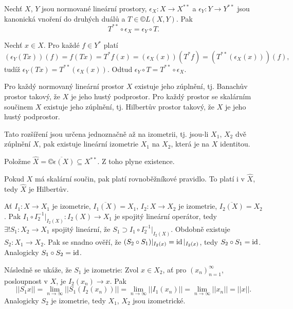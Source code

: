\documentclass[12pt]{article}					%
\begin{document}
\begin{tvrzeni}[J. P. Schauder, 1930]
	Nechť $X$, $Y$ jsou normované lineární prostory, $\epsilon_X: X \rightarrow X^{**}$ a $\epsilon_Y: Y \rightarrow Y^{**}$ jsou kanonická vnoření do druhých duálů a $T \in ©L(X, Y)$. Pak
	$$ T^{**} \circ \epsilon_X = \epsilon_Y \circ T. $$


	\begin{dukazin}[Ze skript]
		Nechť $x \in X$. Pro každé $f \in Y^*$ platí
		$$ (\epsilon_Y(Tx))(f) = f(Tx) = T^*f(x) = (\epsilon_X(x))(T^* f) = (T^{**}(\epsilon_X(x)))(f), $$
		tudíž $\epsilon_Y(Tx) = T^{**}(\epsilon_X(x))$. Odtud $\epsilon_Y \circ T = T^{**} \circ \epsilon_X$.
	\end{dukazin}
\end{tvrzeni}

\begin{veta}
	Pro každý normovaný lineární prostor $X$ existuje jeho zúplnění, tj. Banachův prostor takový, že $X$ je jeho hustý podprostor. Pro každý prostor se skalárním součinem $X$ existuje jeho zúplnění, tj. Hilbertův prostor takový, že $X$ je jeho hustý podprostor.

	Tato rozšíření jsou určena jednoznačně až na izometrii, tj. jsou-li $X_1$, $X_2$ dvě zúplnění $X$, pak existuje lineární izometrie $X_1$ na $X_2$, která je na $X$ identitou.

	\begin{dukazin}
		Položme $\hat{X} = \overline{©\epsilon(X)} \subseteq X^{**}$. Z toho plyne existence.

		Pokud $X$ má skalární součin, pak platí rovnoběžníkové pravidlo. To platí i v $\hat{X}$, tedy $\hat{X}$ je Hilbertův.

		Ať $I_1: X \rightarrow X_1$ je izometrie, $\overline{I_1(X)} = X_1$, $I_2: X \rightarrow X_2$ je izometrie, $\overline{I_2(X)} = X_2$. Pak $I_1 \circ I_2^{-1}|_{I_2(X)}: I_2(X) \rightarrow X_1$ je spojitý lineární operátor, tedy $\exists! S_1: X_2 \rightarrow X_1$ spojitý lineární, že $S_1 \supset I_1 \circ I_2^{-1}|_{I_2(X)}$. Obdobně existuje $S_2: X_1 \rightarrow X_2$. Pak se snadno ověří, že $(S_2 \circ S_1)|_{I_2(x)} = \operatorname{id}|_{I_2(x)}$, tedy $S_2 \circ S_1 = \operatorname{id}$. Analogicky $S_1 \circ S_2 = \operatorname{id}$.

		Následně se ukáže, že $S_1$ je izometrie: Zvol $x \in X_2$, ať pro $(x_n)_{n=1}^∞$, posloupnost v $X$, je $I_2(x_n) \rightarrow x$. Pak
		$$ ||S_1 x|| = \lim_{n \rightarrow ∞}||S_1(I_2(x_n))|| = \lim_{n \rightarrow ∞} ||I_1(x_n)|| = \lim_{n \rightarrow ∞}||x_n|| = ||x||. $$
		Analogicky $S_2$ je izometrie, tedy $X_1$, $X_2$ jsou izometrické.
	\end{dukazin}

\end{veta}
	
\end{document}
